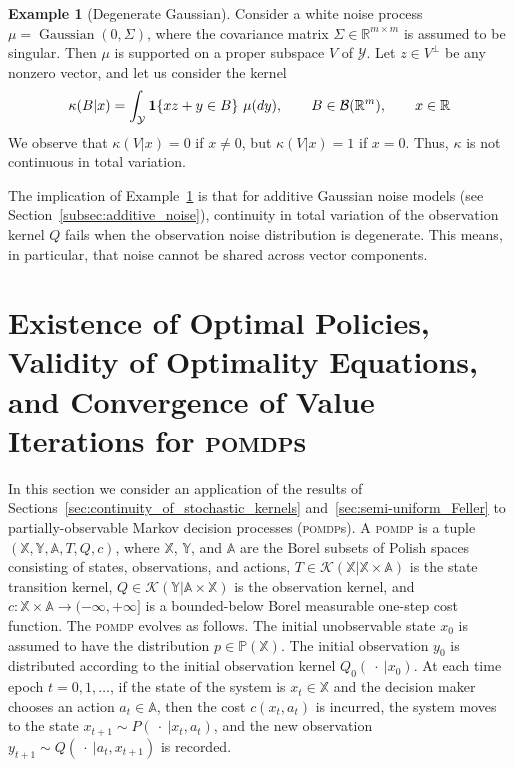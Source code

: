 \documentclass[11pt,onecolumn]{IEEEtran}  %
\newcommand{\Ab}{\mathbb{A}}
\newcommand{\Pb}{\mathbb{P}}
\newcommand{\Rb}{\mathbb{R}}
\newcommand{\Xb}{\mathbb{X}}
\newcommand{\Yb}{\mathbb{Y}}
\newcommand{\Bc}{\mathcal{B}}
\newcommand{\Kc}{\mathcal{K}}
\newcommand{\Yc}{\mathcal{Y}}
\newcommand{\one}[1]{\mathbf{1}\set{#1}}
\newcommand{\pomdp}{\textsc{pomdp}}
\DeclareMathOperator{\Gaussian}{\mathrm{Gaussian}}
\DeclarePairedDelimiter{\set}{\{}{\}}
\theoremstyle{definition}
\newtheorem{example}{Example}
\begin{document}
\begin{example}[Degenerate Gaussian] \label{ex:degenerate_gaussian}
    Consider a white noise process $\mu = \Gaussian(0, \Sigma)$, where the covariance matrix $\Sigma \in \Rb^{m \times m}$ is assumed to be singular. Then $\mu$ is supported on a proper subspace $V$ of $\Yc$. Let $z \in V^\perp$ be any nonzero vector, and let us consider the kernel 
    \begin{equation*}
        \kappa(B|x) = 
        \int_{\Yc} \one{xz + y \in B} \ \mu(dy), \qquad B \in \Bc(\Rb^m), \qquad x \in \Rb
    \end{equation*}
    We observe that $\kappa(V|x) = 0$ if $x \ne 0$, but $\kappa(V|x) = 1$ if $x = 0$. Thus, $\kappa$ is not continuous in total variation.
\end{example}

The implication of Example~\ref{ex:degenerate_gaussian} is that for additive Gaussian noise models (see Section~\ref{subsec:additive_noise}), continuity in total variation of the observation kernel $Q$ fails when the observation noise distribution is degenerate. This means, in particular, that noise cannot be shared across vector components.


\section{Existence of Optimal Policies, Validity of Optimality Equations, and Convergence of Value Iterations for \pomdp{}s} \label{sec:pomdp_kernels}

In this section we consider an application of the results of Sections~\ref{sec:continuity_of_stochastic_kernels} and~\ref{sec:semi-uniform_Feller} to partially-observable Markov decision processes (\pomdp{}s). A \pomdp{} is a tuple $(\Xb, \Yb, \Ab, T, Q, c)$, where $\Xb$, $\Yb$, and $\Ab$ are the Borel subsets of Polish spaces consisting of states, observations, and actions, $T \in \Kc(\Xb| \Xb \times \Ab)$ is the state transition kernel, $Q \in \Kc(\Yb| \Ab \times \Xb)$ is the observation kernel, and $c : \Xb \times \Ab \to (-\infty, +\infty]$ is a bounded-below Borel measurable one-step cost function. The \pomdp{} evolves as follows. The initial unobservable state $x_0$ is assumed to have the distribution $p \in \Pb(\Xb)$. The initial observation $y_0$ is distributed according to the initial observation kernel $Q_{0}\left(\:\cdot\:| x_{0}\right)$. At each time epoch $t=0,1, \ldots$, if the state of the system is $x_{t} \in \Xb$ and the decision maker chooses an action $a_{t} \in \Ab$, then the cost $c(x_{t}, a_{t})$ is incurred,  the system moves to the state $x_{t+1} \sim P(\:\cdot\: | x_{t}, a_{t})$, and the new observation $y_{t+1} \sim Q(\:\cdot\: | a_{t}, x_{t+1})$ is recorded.
\end{document}
